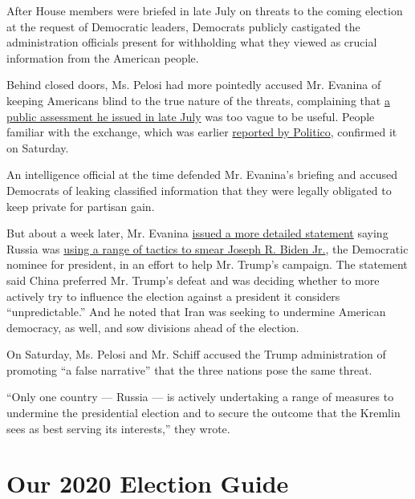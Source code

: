 After House members were briefed in late July on threats to the coming
election at the request of Democratic leaders, Democrats publicly
castigated the administration officials present for withholding what
they viewed as crucial information from the American people.

Behind closed doors, Ms. Pelosi had more pointedly accused Mr. Evanina
of keeping Americans blind to the true nature of the threats,
complaining that
\href{https://www.dni.gov/index.php/newsroom/press-releases/item/2135-statement-by-ncsc-director-william-evanina-100-days-until-election-2020}{a
public assessment he issued in late July} was too vague to be useful.
People familiar with the exchange, which was earlier
\href{https://www.politico.com/news/2020/07/31/nancy-pelosi-william-evanina-russia-meddling-389847}{reported
by Politico}, confirmed it on Saturday.

An intelligence official at the time defended Mr. Evanina's briefing and
accused Democrats of leaking classified information that they were
legally obligated to keep private for partisan gain.

But about a week later, Mr. Evanina
\href{https://www.dni.gov/index.php/newsroom/press-releases/item/2139-statement-by-ncsc-director-william-evanina-election-threat-update-for-the-american-public}{issued
a more detailed statement} saying Russia was
\href{https://www.nytimes3xbfgragh.onion/2020/08/07/us/politics/russia-china-trump-biden-election-interference.html}{using
a range of tactics to smear Joseph R. Biden Jr.}, the Democratic nominee
for president, in an effort to help Mr. Trump's campaign. The statement
said China preferred Mr. Trump's defeat and was deciding whether to more
actively try to influence the election against a president it considers
``unpredictable.'' And he noted that Iran was seeking to undermine
American democracy, as well, and sow divisions ahead of the election.

On Saturday, Ms. Pelosi and Mr. Schiff accused the Trump administration
of promoting ``a false narrative'' that the three nations pose the same
threat.

``Only one country --- Russia --- is actively undertaking a range of
measures to undermine the presidential election and to secure the
outcome that the Kremlin sees as best serving its interests,'' they
wrote.

\hypertarget{our-2020-election-guide}{%
\section{Our 2020 Election Guide}\label{our-2020-election-guide}}

